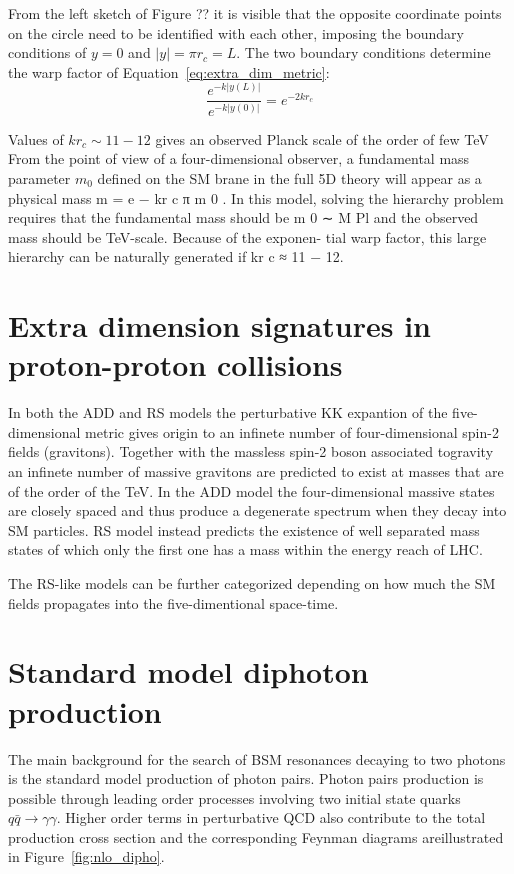 From the left sketch of Figure ?? it is visible that the opposite coordinate points on the circle need to be
identified with each other, imposing the boundary conditions of $y = 0$ and $|y| = \pi r_c = L$.
The two boundary conditions determine the warp factor of Equation~\ref{eq:extra_dim_metric}:
\[
  \frac{e^{-k|y(L)|}}{e^{-k|y(0)|}} = e^{-2kr_c}
\]



Values of $kr_c \sim 11-12$ gives an observed Planck scale of the order of few TeV
From the point of view of a four-dimensional observer, a fundamental mass
parameter $m_0$ defined on the SM brane in the full 5D theory will appear as a physical mass
m = e − kr c π m 0 . In this model, solving the hierarchy problem requires that the fundamental
mass should be m 0 ∼ M Pl and the observed mass should be TeV-scale. Because of the exponen-
tial warp factor, this large hierarchy can be naturally generated if kr c ≈ 11 − 12.

\section{Extra dimension signatures in proton-proton collisions}
In both the ADD and RS models the perturbative KK expantion of the five-dimensional metric
gives origin to an infinete number of four-dimensional spin-2 fields (gravitons). Together with
the massless spin-2 boson associated togravity an infinete number of massive gravitons are predicted to exist
at masses that are of the order of the TeV.
In the ADD model the four-dimensional massive states
are closely spaced and thus produce a degenerate spectrum when they decay into SM particles.
RS model instead predicts the existence of well separated mass states of which only the first one has a mass
within the energy reach of LHC.

The RS-like models can be further categorized depending on how much the SM fields propagates into the five-dimentional
space-time. 

\section{Standard model diphoton production}
\label{sec:sm_dipho_prod}
The main background for the search of BSM resonances decaying to two photons is the standard model production
of photon pairs. Photon pairs production is possible through leading order processes involving two
initial state quarks $q\bar{q}\to\gamma\gamma$. Higher order terms in perturbative QCD also contribute to
the total production cross section and the corresponding Feynman diagrams areillustrated in Figure~\ref{fig:nlo_dipho}.
